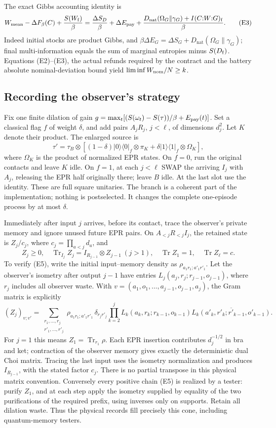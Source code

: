 \documentclass[11pt]{article}
\theoremstyle{definition}
\theoremstyle{remark}
\newcommand{\Tr}{\operatorname{Tr}}
\providecommand{\D}{D_{\mathrm{nat}}}
\begin{document}
The exact Gibbs accounting identity is
\[
 W_{\rm mean}-\Delta F_\beta(C)+\frac{S(W_{\rm f})}{\beta}
 =\frac{\Delta S_D}{\beta}+\Delta E_{\rm pay}
  +\frac{\D(\Omega_G\|\gamma_G)+I(C{:}W{:}G)_{\rm f}}{\beta}. \tag{E3}
\]
Indeed initial stocks are product Gibbs, and
\(\beta\Delta E_G=\Delta S_G+\D(\Omega_G\|\gamma_G)\);
final multi-information equals the sum of marginal entropies minus
\(S(D_{\rm f})\). Equations (E2)--(E3), the actual refunds required by the contract and the
battery absolute nominal-deviation bound yield
\(\liminf W_{\rm nom}/N\ge k\).

\subsection{Recording the observer's strategy}
Fix one finite dilation of gain
\(g=\max_t[(S(\omega_t)-S(\tau))/\beta+E_{\rm pay}(t)]\).
Set a classical flag \(f\) of weight \(\delta\), and add pairs
\(A_jR_j\), \(j<\ell\), of dimensions \(d_j^2\). Let \(K\) denote their
product. The enlarged source is
\[
 \tau'=\tau_B\otimes
 [(1-\delta)|0\rangle\langle0|_f\otimes\pi_K
   +\delta|1\rangle\langle1|_f\otimes\Omega_K],        \tag{E4}
\]
where \(\Omega_K\) is the product of normalized EPR states.
On \(f=0\), run the original contacts and leave \(K\) idle.
On \(f=1\), at each \(j<\ell\) SWAP the arriving \(I_j\) with \(A_j\),
releasing the EPR half originally there; leave \(B\) idle. At the last
slot use the identity. These are full square unitaries.
The branch is a coherent part of the implementation; nothing is
postselected. It changes the complete one-episode process by at most
\(\delta\).

Immediately after input \(j\) arrives, before its contact, trace the
observer's private memory and ignore unused future EPR pairs.
On \(A_{<j}R_{<j}I_j\), the retained
state is \(Z_j/c_j\), where \(c_j=\prod_{a<j}d_a\), and
\[
 Z_j\ge0,\quad
 \Tr_{I_j}Z_j=I_{R_{j-1}}\otimes Z_{j-1}\ (j>1),
 \quad \Tr Z_1=1,\quad \Tr Z_\ell=c.                 \tag{E5}
\]
To verify (E5), write the initial input--memory density as
\(\rho_{a_1r_1;a'_1r'_1}\). Let the observer's isometry after
output \(j-1\) have entries
\(L_j(a_j,r_j;r_{j-1},o_{j-1})\), where \(r_j\) includes all
observer waste. With \(v=(a_1,o_1,\ldots,a_{j-1},o_{j-1},a_j)\),
the Gram matrix is explicitly
\[
 (Z_j)_{v;v'}=
 \sum_{\substack{r_1,\ldots,r_j\\r'_1,\ldots,r'_j}}
 \rho_{a_1r_1;a'_1r'_1}\,\delta_{r_jr'_j}
 \prod_{k=2}^j
 L_k(a_k,r_k;r_{k-1},o_{k-1})
 \overline{L_k(a'_k,r'_k;r'_{k-1},o'_{k-1})}.
 \]
For \(j=1\) this means \(Z_1=\Tr_{r_1}\rho\).
Each EPR insertion contributes
\(d_j^{-1/2}\) in bra and ket; contraction of the observer memory gives
exactly the deterministic dual Choi matrix. Tracing the last input
uses the isometry normalization and produces \(I_{R_{j-1}}\), with
the stated factor \(c_j\). There is no partial transpose in this
physical matrix convention. Conversely every positive chain (E5)
is realized by a tester: purify \(Z_1\), and at each step apply the
isometry supplied by equality of the two purifications of the
required prefix, using inverses only on supports. Retain all dilation
waste. Thus the physical records fill precisely this cone, including
quantum-memory testers.
\end{document}
